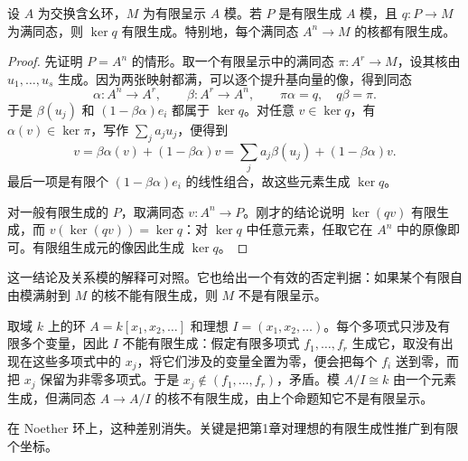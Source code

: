 \begin{proposition}\label{g5:prop:finite-presentation-kernel}
	设 \(A\) 为交换含幺环，\(M\) 为有限呈示 \(A\) 模。若 \(P\) 是有限生成 \(A\) 模，且 \(q:P\rightarrow M\) 为满同态，则 \(\ker q\) 有限生成。特别地，每个满同态 \(A^n\rightarrow M\) 的核都有限生成。
\end{proposition}
\begin{proof}
	先证明 \(P=A^n\) 的情形。取一个有限呈示中的满同态 \(\pi:A^r\rightarrow M\)，设其核由 \(u_1,\ldots,u_s\) 生成。因为两张映射都满，可以逐个提升基向量的像，得到同态
	\[
		\alpha:A^n\longrightarrow A^r,\qquad
		\beta:A^r\longrightarrow A^n,\qquad
		\pi\alpha=q,\quad q\beta=\pi.
	\]
	于是 \(\beta(u_j)\) 和 \((1-\beta\alpha)e_i\) 都属于 \(\ker q\)。对任意 \(v\in\ker q\)，有 \(\alpha(v)\in\ker\pi\)，写作 \(\sum_j a_j u_j\)，便得到
	\[
		v=\beta\alpha(v)+(1-\beta\alpha)v
		=\sum_j a_j\beta(u_j)+(1-\beta\alpha)v.
	\]
	最后一项是有限个 \((1-\beta\alpha)e_i\) 的线性组合，故这些元素生成 \(\ker q\)。

	对一般有限生成的 \(P\)，取满同态 \(v:A^n\rightarrow P\)。刚才的结论说明 \(\ker(qv)\) 有限生成，而 \(v(\ker(qv))=\ker q\)：对 \(\ker q\) 中任意元素，任取它在 \(A^n\) 中的原像即可。有限组生成元的像因此生成 \(\ker q\)。
\end{proof}

这一结论及关系模的解释可对照\cite[第2节，定理2.6]{Matsumura1989}。它也给出一个有效的否定判据：如果某个有限自由模满射到 \(M\) 的核不能有限生成，则 \(M\) 不是有限呈示。

\begin{example}\label{g5:exm:finite-not-presented}
	取域 \(k\) 上的环 \(A=k[x_1,x_2,\ldots]\) 和理想 \(I=(x_1,x_2,\ldots)\)。每个多项式只涉及有限多个变量，因此 \(I\) 不能有限生成：假定有限多项式 \(f_1,\ldots,f_r\) 生成它，取没有出现在这些多项式中的 \(x_j\)，将它们涉及的变量全置为零，便会把每个 \(f_i\) 送到零，而把 \(x_j\) 保留为非零多项式。于是 \(x_j\notin(f_1,\ldots,f_r)\)，矛盾。模 \(A/I\cong k\) 由一个元素生成，但满同态 \(A\rightarrow A/I\) 的核不有限生成，由上个命题知它不是有限呈示。
\end{example}

在 Noether 环上，这种差别消失。关键是把第1章对理想的有限生成性推广到有限个坐标。

